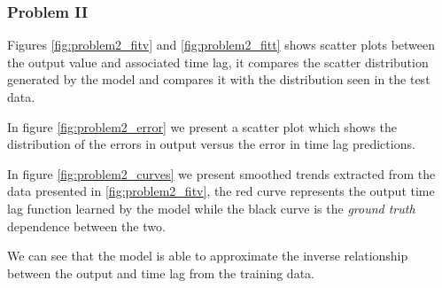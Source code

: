 \documentclass[envcountsect,runningheads]{llncs}
\theoremstyle{etoile}
\begin{document}
\subsubsection{Problem II}

Figures \ref{fig:problem2_fitv} and \ref{fig:problem2_fitt} shows scatter plots between the output value and associated 
time lag, it compares the scatter distribution generated by the model and compares it with the 
distribution seen in the test data.

In figure \ref{fig:problem2_error} we present a scatter plot which shows the distribution of the 
errors in output versus the error in time lag predictions.

In figure \ref{fig:problem2_curves} we present smoothed trends extracted from the data presented in 
\ref{fig:problem2_fitv}, the red curve represents the output time lag function learned by the model 
while the black curve is the \emph{ground truth} dependence between the two. 

We can see that the model is able to approximate the inverse relationship between the output and 
time lag from the training data.
\end{document}
